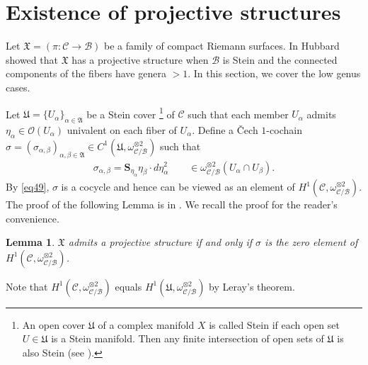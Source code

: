 \documentclass[11pt,b5paper,notitlepage]{article}
\theoremstyle{definition}
\theoremstyle{plain}
\newtheorem{lm}[df]{Lemma}
\newcommand{\fk}{\mathfrak}
\newcommand{\mc}{\mathcal}
\newcommand{\scr}{\mathscr}
\newcommand{\Sbf}{\mathbf{S}}
\numberwithin{equation}{section}
\begin{document}
\section{Existence of projective structures}\label{lb27}


Let $\fk X=(\pi:\mc C\rightarrow\mc B)$ be a family of compact Riemann surfaces. In \cite[Lemma 5]{Hub81} Hubbard showed that $\fk X$ has a projective structure when $\mc B$ is Stein and the connected components of the fibers have genera $>1$. In this section, we cover the low genus cases.

Let $\fk U=\{U_\alpha\}_{\alpha\in\fk A}$ be a Stein cover \footnote{An open cover $\fk U$ of a complex manifold $X$ is called Stein if each open set $U\in\fk U$ is a Stein manifold. Then any finite intersection of open sets of $\fk U$ is also Stein (see \cite[Sec. 1.4.4]{GR84}).} of $\mc C$ such that each member $U_\alpha$ admits $\eta_\alpha\in\scr O(U_\alpha)$ univalent on each fiber of $U_\alpha$. Define a \v Cech $1$-cochain $\sigma=(\sigma_{\alpha,\beta})_{\alpha,\beta\in\fk A}\in C^1(\fk U,\omega_{\mc C/\mc B}^{\otimes 2})$ such that 
\begin{align*}
\sigma_{\alpha,\beta}=\Sbf_{\eta_\alpha}\eta_\beta\cdot d\eta_\alpha^2\qquad \in\omega_{\mc C/\mc B}^{\otimes 2}(U_\alpha\cap U_\beta).
\end{align*}
By \eqref{eq49}, $\sigma$ is a cocycle and hence can be viewed as an element of $H^1(\mc C,\omega_{\mc C/\mc B}^{\otimes 2})$. The proof of the following Lemma is in \cite[Lemma 5]{Hub81}. We recall the proof for the reader's convenience.

\begin{lm}\label{lb26}
	$\fk X$ admits a projective structure if and only if $\sigma$ is the zero element of $H^1(\mc C,\omega_{\mc C/\mc B}^{\otimes 2})$.
\end{lm}

Note that $H^1(\mc C,\omega_{\mc C/\mc B}^{\otimes 2})$ equals $H^1(\fk U,\omega_{\mc C/\mc B}^{\otimes 2})$ by Leray's theorem.
\end{document}
